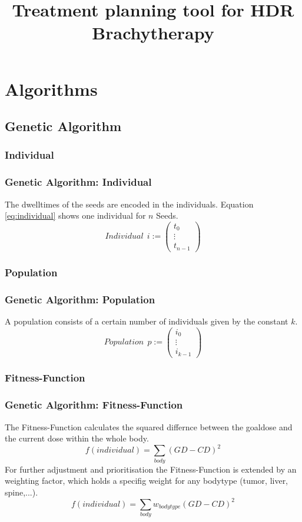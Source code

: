 \documentclass{beamer}
\author[Elm S. \& Karthe T. \& Golebiewski D. \& Schröder M.E.]
{%
   \texorpdfstring{
        \begin{columns}
            \column{.45\linewidth}
            \centering
            \RBox{Elm S.\\
            \href{mailto:subhamsoni0049@pec.edu}{subhamsoni0049@pec.edu}}
            \column{.45\linewidth}
            \centering
            \RBox{Karthe T.\\
            \href{mailto:subhamsoni0049@pec.edu}{subhamsoni0049@pec.edu}}
        \end{columns}
        \vspace{0.5cm}
        \begin{columns}
            \column{.45\linewidth}
            \centering
            \RBox{Golebiewski D.\\
            \href{mailto:subhamsoni0049@pec.edu}{subhamsoni0049@pec.edu}}
            \column{.45\linewidth}
            \centering
            \RBox{Schröder M.E.\\
            \href{mailto:malte.schroeder@tuhh.de}{malte.schroeder@tuhh.de}}
        \end{columns}
        \vspace{-0.3cm}
        \begin{columns}
          \column{0.3\linewidth}
          \raggedleft
            \vspace{-4.8cm}
            \column{0.6\linewidth}
            \raggedright
            Institute of Medical Technology\\[1.1ex]
            TUHH
            \vspace{-4.8cm}
        \end{columns}
   }
   {John Doe \& Jane Doe}
}
\title{Treatment planning tool for HDR Brachytherapy}
\begin{document}
\begin{frame}
\titlepage
\end{frame}
\frame{\tableofcontents}

\section{Algorithms}
\subsection{Genetic Algorithm}
\subsubsection{Individual}

 \begin{frame}
 \frametitle{Genetic Algorithm: Individual}
 The dwelltimes of the seeds are encoded in the individuals. Equation \eqref{eq:individual} shows one individual for $n  $ Seeds.
 \begin{equation}
 \label{eq:individual}
 Individual \ \ i := \begin{pmatrix}
 t_{0} \\ \vdots \\ t_{n-1} 	
\end{pmatrix}   
 \end{equation}
 \end{frame}
 
\subsubsection{Population}
 \begin{frame}
 \frametitle{Genetic Algorithm: Population}
 A population consists of a certain number of individuals given by the constant $ k $.
 \begin{equation}
 \label{eq:population}
 Population \ \ p := \begin{pmatrix}
 i_{0} \\ \vdots \\ i_{k-1} 	
\end{pmatrix}   
 \end{equation}
 \end{frame}
 
 \subsubsection{Fitness-Function}
 \begin{frame}
 \frametitle{Genetic Algorithm: Fitness-Function}
 The Fitness-Function calculates the squared differnce between the goaldose and the current dose within the whole body.
 \begin{equation}
 f(individual) = \sum_{body}(GD-CD)^2
 \end{equation}
 For further adjustment and prioritisation the Fitness-Function is extended by an weighting factor, which holds a specifig weight for any bodytype (tumor, liver, spine,...).
 \begin{equation}
 f(individual) = \sum_{body}w_{bodytype}(GD-CD)^2
 \end{equation}
 \end{frame}
 
\end{document}
